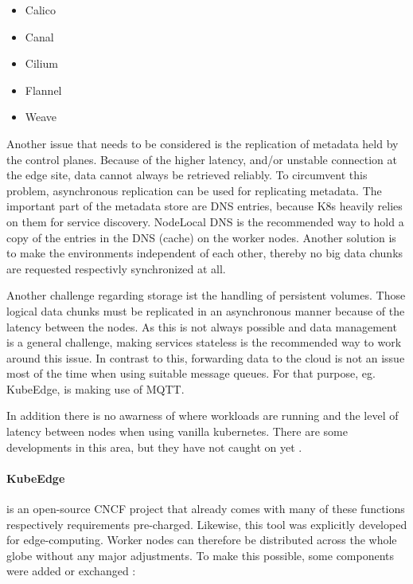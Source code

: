 \documentclass[MIC,Master,english]{twbook}%
\begin{document}
\begin{itemize}
    \itemsep0em
    \item Calico
    \item Canal
    \item Cilium
    \item Flannel
    \item Weave
\end{itemize}

Another issue that needs to be considered is the replication of metadata held by the control planes. Because of the higher latency, and/or unstable connection at the edge site, data cannot always be retrieved reliably. To circumvent this problem, asynchronous replication can be used for replicating metadata. The important part of the metadata store are \ac{DNS} entries, because \ac{K8s} heavily relies on them for service discovery. NodeLocal DNS is the recommended way \cite{k8sdnslocal} to hold a copy of the entries in the \ac{DNS} (cache) on the worker nodes. Another solution is to make the environments independent of each other, thereby no big data chunks are requested respectivly synchronized at all.

Another challenge regarding storage ist the handling of persistent volumes. Those logical data chunks must be replicated in an asynchronous manner because of the latency between the nodes. As this is not always possible and data management is a general challenge, making services stateless is the recommended way to work around this issue. In contrast to this, forwarding data to the cloud is not an issue most of the time when using suitable message queues. For that purpose, eg. KubeEdge, is making use of \ac{MQTT}.  

In addition there is no awarness of where workloads are running and the level of latency between nodes when using vanilla kubernetes. There are some developments in this area, but they have not caught on yet \cite{k8s-sharping-edge,tk-k8s-edge-scheduler,5g-k8s-scheduler}.

\paragraph{KubeEdge} is an open-source \ac{CNCF} project \cite{hal-kubeedge} that already comes with many of these functions respectively requirements pre-charged. Likewise, this tool was explicitly developed for edge-computing. Worker nodes can therefore be distributed across the whole globe without any major adjustments. To make this possible, some components were added or exchanged \cite{kubedge}:
\end{document}
